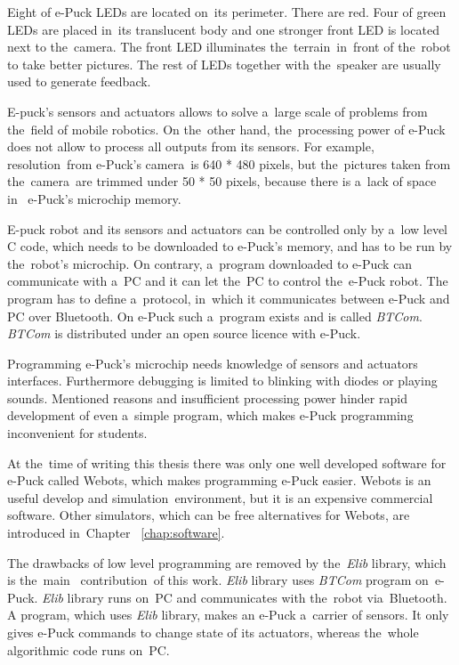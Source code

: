   Eight of e-Puck LEDs are located on~its perimeter. There are red. 
  Four of green LEDs are placed in~its translucent body and
  one stronger front LED is located next to the~camera. 
  The front LED illuminates the~terrain~in~front of the~robot to
  take better pictures. The rest of LEDs together with the~speaker are usually used to
  generate feedback. 
  
  E-puck's sensors and actuators allows to solve a~large scale of problems from the~field of mobile robotics. 
  On the~other hand, the~processing power of e-Puck does not allow to 
  process all outputs from its sensors. For example, resolution~from e-Puck's camera~is 640 * 480 pixels,
  but the~pictures taken from the~camera~are trimmed under 50 * 50 pixels, because there is a~lack of space in~
   e-Puck's microchip memory.
   
   E-puck robot and its sensors and actuators can be controlled only by a~low level C code,
    which needs to be downloaded to e-Puck's memory, and has to be run by the~robot's microchip.
   On contrary, a~program downloaded to e-Puck can communicate with
   a~PC and it can let the~PC to control the~e-Puck robot. 
   The program has to define a~protocol, in~which it communicates between e-Puck and PC over Bluetooth.
  On e-Puck such a~program exists and is called {\it BTCom}. 
  {\it BTCom} is distributed under an open source licence with e-Puck.

  Programming e-Puck's microchip needs knowledge of sensors and actuators interfaces.
  Furthermore debugging is limited to blinking with diodes or playing sounds.
  Mentioned reasons and insufficient processing power hinder rapid development of even a~simple program, 
  which makes e-Puck programming inconvenient for students.
  
  At the~time of writing this thesis there was only one well developed software for e-Puck called Webots,
  which makes programming e-Puck easier.
  Webots is an useful develop and simulation~environment, but it is an expensive commercial software.
  Other simulators, which can be free alternatives for Webots, are introduced in~Chapter ~\ref{chap:software}.
  
  The drawbacks of low level programming are removed by the~{\it Elib} library, which is the~main~
  contribution~of this work.
  {\it Elib} library uses {\it BTCom} program on~e-Puck.
  {\it Elib} library runs on~PC and communicates with the~robot via~Bluetooth. 
  A program, which uses {\it Elib} library,	makes an e-Puck a~carrier of sensors. It only gives e-Puck 	
  commands to change state of its actuators, whereas the~whole algorithmic code runs on~PC.
  
